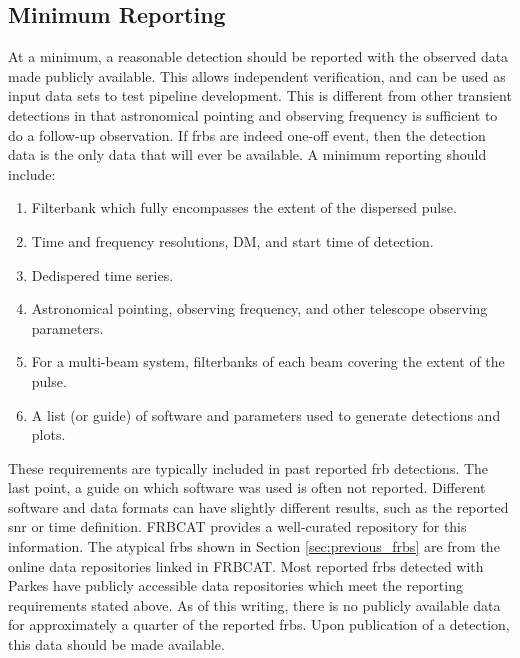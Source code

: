 \documentclass[a4paper,fleqn,usenatbib]{mnras}
\begin{document}
\subsection{Minimum Reporting}

At a minimum, a reasonable detection should be reported with the observed data
made publicly available.  This allows independent verification, and can be used
as input data sets to test pipeline development.  This is different from other
transient detections in that astronomical pointing and observing frequency is
sufficient to do a follow-up observation. If \glspl{frb} are indeed one-off
event, then the detection data is the only data that will ever be available. A
minimum reporting should include:

\begin{enumerate}
    \item Filterbank which fully encompasses the extent of the dispersed pulse.
    \item Time and frequency resolutions, DM, and start time of detection.
    \item Dedispered time series.
    \item Astronomical pointing, observing frequency, and other telescope
    observing parameters.
    \item For a multi-beam system, filterbanks of each beam covering the extent
    of the pulse.
    \item A list (or guide) of software and parameters used to generate
    detections and plots.
\end{enumerate}

These requirements are typically included in past reported \gls{frb} detections.
The last point, a guide on which software was used is often not reported.
Different software and data formats can have slightly different results, such as
the reported \gls{snr} or time definition.  FRBCAT \citep{2016PASA...33...45P}
provides a well-curated repository for this information. The atypical
\glspl{frb} shown in Section \ref{sec:previous_frbs} are from the online data
repositories linked in FRBCAT. Most reported \glspl{frb} detected with Parkes
have publicly accessible data repositories which meet the reporting requirements
stated above. As of this writing, there is no publicly available data for
approximately a quarter of the reported \glspl{frb}. Upon publication of a
detection, this data should be made available.
\end{document}
